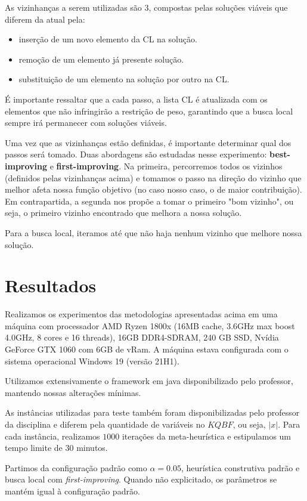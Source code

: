 \documentclass[11pt]{article}
\begin{document}
As vizinhanças a serem utilizadas são \(3\), compostas pelas soluções viáveis que diferem da atual pela:
\begin{itemize}
\item inserção de um novo elemento da CL na solução.
\item remoção de um elemento já presente solução.
\item substituição de um elemento na solução por outro na CL.
\end{itemize}

É importante ressaltar que a cada passo, a lista CL é atualizada com os elementos que não infringirão a restrição de peso, garantindo que a busca local sempre irá permanecer com soluções viáveis.

Uma vez que as vizinhanças estão definidas, é importante determinar qual dos passos será tomado. Duas abordagens são estudadas nesse experimento: \textbf{best-improving} e \textbf{first-improving}. Na primeira, percorremos todos os vizinhos (definidos pelas vizinhanças acima) e tomamos o passo na direção do vizinho que melhor afeta nossa função objetivo (no caso nosso caso, o de maior contribuição). Em contrapartida, a segunda nos propõe a tomar o primeiro "bom vizinho", ou seja, o primeiro vizinho encontrado que melhora a nossa solução.

Para a busca local, iteramos até que não haja nenhum vizinho que melhore nossa solução.
\section*{Resultados}
\label{sec:org01ea080}
Realizamos os experimentos das metodologias apresentadas acima em uma máquina com processador AMD Ryzen 1800x (16MB cache, 3.6GHz max boost 4.0GHz, 8 cores e 16 threads), 16GB DDR4-SDRAM, 240 GB SSD, Nvídia GeForce GTX 1060 com 6GB de vRam. A máquina estava configurada com o sistema operacional Windows 19 (versão 21H1).

Utilizamos extensivamente o framework em java disponibilizado pelo professor, mantendo nossas alterações mínimas.

As instâncias utilizadas para teste também foram disponibilizadas pelo professor da disciplina e diferem pela quantidade de variáveis no \(KQBF\), ou seja, \(|x|\). Para cada instância, realizamos \(1000\) iterações da meta-heurística e estipulamos um tempo limite de \(30\) minutos.

Partimos da configuração padrão como \(\alpha = 0.05\), heurística construtiva padrão e busca local com \emph{first-improving}. Quando não explicitado, os parâmetros se mantém igual à configuração padrão.
\end{document}
